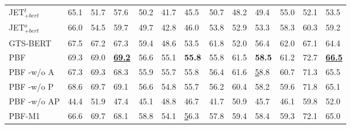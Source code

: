 \documentclass[11pt]{article}
\begin{document}
\begin{table*}
\begin{tabular}{|l|lll|lll|lll|lll|}
		JET$^t_{+bert}$ & 65.1                  & 51.7                  & 57.6                    & 50.2                  & 41.7                  & 45.5                    & 50.7                  & 48.2                  & 49.4                    & 55.0                  & 52.1                  & 53.5                    \\
		JET$^o_{+bert}$ & 66.0                  & 54.5                  & 59.7                    & 49.7                  & 42.8                  & 46.0                    & 53.8                  & 52.9                  & 53.3                    & 58.3                  & 60.3                  & 59.2                    \\
		GTS-BERT        & 67.5                  & 67.2                  & 67.3                    & 59.4                  & 48.6                  & 53.5                    & 61.8                  & 52.0                  & 56.4                    & 62.0                  & 67.1                  & 64.4                    \\ \hline
		PBF             & 69.3                  & 69.0                  & {\ul \textbf{69.2}}     & 56.6                  & 55.1                  & \textbf{55.8}           & 55.8                  & 61.5                  & \textbf{58.5}           & 61.2                  & 72.7                  & {\ul \textbf{66.5}}     \\
		PBF -w/o A      & 67.3                  & 69.3                  & 68.3                    & 55.9                  & 55.7                  & 55.8                    & 56.4                  & 61.6                  & {\ul 58.8}              & 60.7                  & 71.3                  & 65.5                    \\
		PBF -w/o P      & 68.6                  & 69.7                  & 69.1                    & 56.6                  & 54.8                  & 55.7                    & 56.2                  & 60.4                  & 58.2                    & 59.6                  & 71.8                  & 65.1                    \\
		PBF -w/o AP     & 44.4                  & 51.9                  & 47.4                    & 45.1                  & 48.8                  & 46.7                    & 41.7                  & 50.9                  & 45.7                    & 46.1                  & 59.8                  & 52.0                    \\
		PBF-M1          & 66.6                  & 69.7                  & 68.1                    & 58.8                  & 54.1                  & {\ul 56.3}              & 57.8                  & 59.4                  & 58.4                    & 59.3                  & 72.1                  & 65.0                    \\

\end{tabular}
\end{table*}
\end{document}
